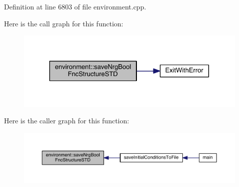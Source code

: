Definition at line 6803 of file environment.\-cpp.



Here is the call graph for this function\-:
\nopagebreak
\begin{figure}[H]
\begin{center}
\leavevmode
\includegraphics[width=326pt]{a00014_a1412b9b1c3bd3e42bcb481f5e18ea931_cgraph}
\end{center}
\end{figure}




Here is the caller graph for this function\-:
\nopagebreak
\begin{figure}[H]
\begin{center}
\leavevmode
\includegraphics[width=350pt]{a00014_a1412b9b1c3bd3e42bcb481f5e18ea931_icgraph}
\end{center}
\end{figure}


